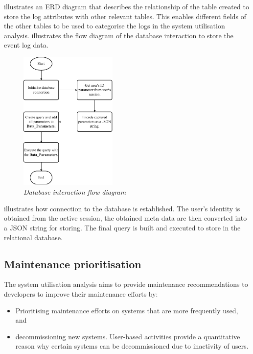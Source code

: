  illustrates an ERD diagram that describes the relationship of the table created to store the log attributes with other relevant tables. This enables different fields of the other tables to be used to categorise the logs in the system utilisation analysis.  illustrates the flow diagram of the database interaction to store the event log data.

\begin{figure}[!htb]
	\centering
	\includegraphics[width=0.43\textwidth]{img/Chapter2/sql_interaction/sql_interaction.pdf}
	\caption[Database interaction flow diagram]
	{\textit{Database interaction flow diagram}}\label{fig:ch2_database}
\end{figure}

 illustrates how connection to the database is established. The user's identity is obtained from the active session, the obtained meta data are then converted into a JSON string for storing. The final query is built and executed to store in the relational database.

\subsection{Maintenance prioritisation}
The system utilisation analysis aims to provide maintenance recommendations to developers to improve their maintenance efforts by:

\begin{itemize}
	\item Prioritising maintenance efforts on systems that are more frequently used, and
	\item decommissioning new systems. User-based activities provide a quantitative reason why certain systems can be decommissioned due to inactivity of users.
\end{itemize}

